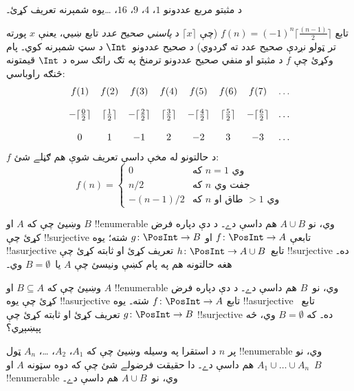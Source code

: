 \documentclass[../../../include/open-logic-section]{subfiles}
\begin{document}
\begin{prob}
د مثبتو مربع عددونو $1$، $4$، $9$، $16$، \dots يوه شمېرنه تعريف کړئ۔
\end{prob}

\begin{ex}
تابع $f(n) = (-1)^{n} \lceil \frac{(n-1)}{2}\rceil$ (چې
$\lceil x \rceil$ د \emph{پاسني صحيح عدد} تابع ښيي، يعنې $x$
پورته تر ټولو نږدې صحيح عدد ته ګردوي) د صحيح عددونو~$\Int$
د سټ شمېرنه کوي۔ پام وکړئ چې $f$ د مثبتو او منفي صحيح عددونو
ترمنځ په تګ راتګ سره د $\Int$ قيمتونه څنګه راوباسي:
\[
\begin{array}{c c c c c c c c}
f(1) & f(2) & f(3) & f(4) & f(5) & f(6) & f(7) & \dots \\ \\
- \lceil \tfrac{0}{2} \rceil & \lceil \tfrac{1}{2}\rceil & - \lceil \tfrac{2}{2} \rceil & \lceil \tfrac{3}{2} \rceil & - \lceil \tfrac{4}{2} \rceil  & \lceil \tfrac{5}{2}
\rceil & - \lceil \tfrac{6}{2} \rceil & \dots \\ \\
0 & 1 & -1 & 2 & -2 & 3 & -3 & \dots
\end{array}
\]
$f$ د حالتونو له مخې داسې تعريف شوې هم ګڼلے شئ:
\[
f(n) = \begin{cases}
  0 & \text{که $n = 1$ وي}\\
  n/2 & \text{که $n$ جفت وي}\\
  -(n-1)/2 & \text{که $n$ طاق او $>1$ وي}
  \end{cases}
\]
\end{ex}

\begin{prob}
  وښيئ چې که $A$ او $B$ !!{enumerable} وي، نو $A \cup B$ هم
  داسې دے۔ د دې دپاره فرض کړئ چې !!{surjective} تابعې
  $f\colon \PosInt \to A$ او $g\colon \PosInt \to B$ شته؛
  يوه !!a{surjective} تابع~$h\colon \PosInt \to A \cup B$
  تعريف کړئ او ثابته کړئ چې !!{surjective} ده۔ هغه حالتونه
  هم په پام کښې ونيسئ چې $A$ يا~$B = \emptyset$ وي۔
\end{prob}
  
\begin{prob}
  وښيئ چې که $B \subseteq A$ او $A$ !!{enumerable} وي، نو~$B$
  هم داسې دے۔ د دې دپاره فرض کړئ چې يوه !!a{surjective}
  تابع $f\colon \PosInt \to A$ شته۔ يوه !!a{surjective}
  تابع~$g\colon \PosInt \to B$ تعريف کړئ او ثابته کړئ چې
  !!{surjective} ده۔ که $B = \emptyset$ وي، څه پېښېږي؟
\end{prob}
    
\begin{prob}
  پر $n$ د استقرا په وسيله وښيئ چې که $A_1$، $A_2$، \dots،
  $A_n$ ټول !!{enumerable} وي، نو $A_1 \cup \dots \cup A_n$
  هم داسې دے۔ دا حقيقت فرضولے شئ چې که دوه سټونه $A$ او~$B$
  !!{enumerable} وي، نو~$A \cup B$ هم داسې دے۔
\end{prob}
\end{document}
